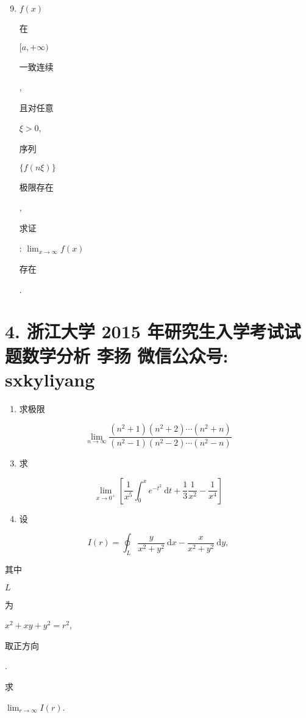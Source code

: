 \documentclass[10pt]{article}
\begin{document}
\begin{enumerate}
  \setcounter{enumi}{8}
  \item $f(x)$ \begin{CJK}{UTF8}{mj}在\end{CJK} $[a,+\infty)$ \begin{CJK}{UTF8}{mj}一致连续\end{CJK}, \begin{CJK}{UTF8}{mj}且对任意\end{CJK} $\xi>0$, \begin{CJK}{UTF8}{mj}序列\end{CJK} $\{f(n \xi)\}$ \begin{CJK}{UTF8}{mj}极限存在\end{CJK}, \begin{CJK}{UTF8}{mj}求证\end{CJK}: $\lim _{x \rightarrow \infty} f(x)$ \begin{CJK}{UTF8}{mj}存在\end{CJK}.
\end{enumerate}
\section{4. 浙江大学 2015 年研究生入学考试试题数学分析 
 李扬 
 微信公众号: sxkyliyang}
\begin{enumerate}
  \item \begin{CJK}{UTF8}{mj}求极限\end{CJK}
\end{enumerate}
$$
\lim _{n \rightarrow \infty} \frac{\left(n^{2}+1\right)\left(n^{2}+2\right) \cdots\left(n^{2}+n\right)}{\left(n^{2}-1\right)\left(n^{2}-2\right) \cdots\left(n^{2}-n\right)}
$$

\begin{enumerate}
  \setcounter{enumi}{2}
  \item \begin{CJK}{UTF8}{mj}求\end{CJK}
\end{enumerate}
$$
\lim _{x \rightarrow 0^{+}}\left[\frac{1}{x^{5}} \int_{0}^{x} e^{-t^{2}} \mathrm{~d} t+\frac{1}{3} \frac{1}{x^{2}}-\frac{1}{x^{4}}\right]
$$

\begin{enumerate}
  \setcounter{enumi}{3}
  \item \begin{CJK}{UTF8}{mj}设\end{CJK}
\end{enumerate}
$$
I(r)=\oint_{L} \frac{y}{x^{2}+y^{2}} \mathrm{~d} x-\frac{x}{x^{2}+y^{2}} \mathrm{~d} y,
$$
\begin{CJK}{UTF8}{mj}其中\end{CJK} $L$ \begin{CJK}{UTF8}{mj}为\end{CJK} $x^{2}+x y+y^{2}=r^{2}$, \begin{CJK}{UTF8}{mj}取正方向\end{CJK}. \begin{CJK}{UTF8}{mj}求\end{CJK} $\lim _{r \rightarrow \infty} I(r)$.
\end{document}
